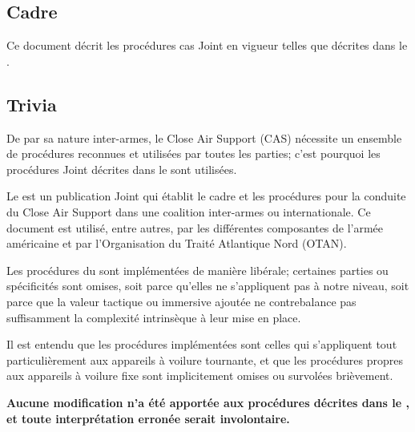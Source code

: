 
%

\begin{imini}
\subsection*{Cadre}

\vfil

Ce document décrit les procédures \acrfull{cas} Joint en vigueur telles que décrites dans le \jp{}.

\vfill

\subsection*{Trivia}

\vfil

De par sa nature inter-armes, le Close Air Support (CAS) nécessite un ensemble de procédures reconnues et utilisées par toutes les parties; c'est pourquoi les procédures Joint décrites dans le \jp{} sont utilisées.

\vfil

Le \jp{} est un publication Joint qui établit le cadre et les procédures pour la conduite du Close Air Support dans une coalition inter-armes ou internationale. Ce document est utilisé, entre autres, par les différentes composantes de l'armée américaine et par l'Organisation du Traité Atlantique Nord (OTAN).

\vfil

Les procédures du \jp{} sont implémentées de manière libérale; certaines parties ou spécificités sont omises, soit parce qu'elles ne s'appliquent pas à notre niveau, soit parce que la valeur tactique ou immersive ajoutée ne contrebalance pas suffisamment la complexité intrinsèque à leur mise en place.

\vfil

Il est entendu que les procédures implémentées sont celles qui s'appliquent tout particulièrement aux appareils à voilure tournante, et que les procédures propres aux appareils à voilure fixe sont implicitement omises ou survolées brièvement.

\vfil

\textbf{Aucune modification n'a été apportée aux procédures décrites dans le \jp{}, et toute interprétation erronée serait involontaire.}
\end{imini}